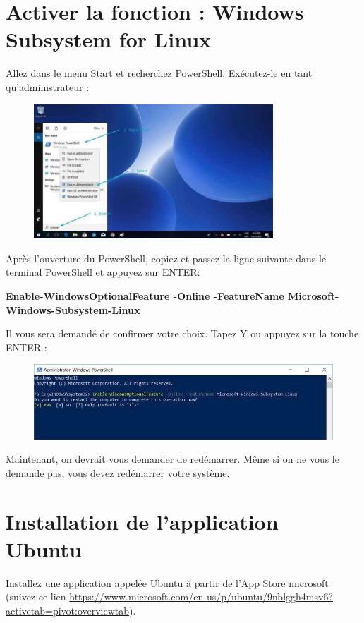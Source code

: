\documentclass{article}
\begin{document}
\section{Activer la fonction : Windows Subsystem for Linux}
Allez dans le menu Start et recherchez PowerShell. Exécutez-le en tant qu'administrateur :
\begin{figure}[H]
\center
\includegraphics[width=0.8\textwidth]{Plots/Powershell-Ubuntu-install.jpg}
\end{figure}
Après l'ouverture du PowerShell, copiez et passez la ligne suivante dans le terminal PowerShell et appuyez sur ENTER:

\begin{tcolorbox}[width=\textwidth,colback={purple},title={PowerShell terminal},outer arc=0mm,colupper=white]    
    \textbf{ Enable-WindowsOptionalFeature -Online -FeatureName Microsoft-Windows-Subsystem-Linux }
\end{tcolorbox}
Il vous sera demandé de confirmer votre choix. Tapez Y ou appuyez sur la touche ENTER :
\begin{figure}[H]
\includegraphics[width=1\textwidth]{Plots/Powershell-Ubuntu-install-2.jpg}
\end{figure}

Maintenant, on devrait vous demander de redémarrer. Même si on ne vous le demande pas, vous devez redémarrer votre système.

\section{Installation de l'application Ubuntu}
Installez une application appelée Ubuntu à partir de l'App Store microsoft (suivez ce lien \href{https://www.microsoft.com/en-us/p/ubuntu/9nblggh4msv6?activetab=pivot:overviewtab}{https://www.microsoft.com/en-us/p/ubuntu/9nblggh4msv6?activetab=pivot:overviewtab}).
\end{document}

